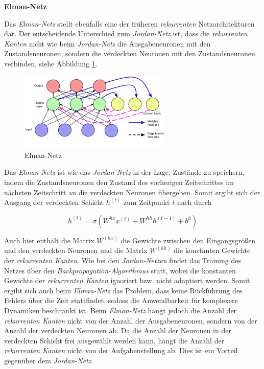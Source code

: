 \textbf{Elman-Netz}

Das \textit{Elman-Netz} stellt ebenfalls eine der früheren \textit{rekurrenten} Netzarchitekturen dar. Der entscheidende Unterschied zum \textit{Jordan-Netz} ist, dass die \textit{rekurrenten Kanten} nicht wie beim \textit{Jordan-Netz} die Ausgabeneuronen mit den Zustandsneuronen, sondern die verdeckten Neuronen mit den Zustandsneuronen verbinden, siehe Abbildung \ref{fig:elman}.

\begin{figure} [h]
	\centering
	\includegraphics[width=0.65\textwidth]{images/elman}
	\caption{Elman-Netz \cite{Lipton.5292015}}
	\label{fig:elman}
\end{figure}

Das \textit{Elman-Netz} ist wie das \textit{Jordan-Netz} in der Lage, Zustände zu speichern, indem die Zustandsneuronen den Zustand des vorherigen Zeitschrittes im nächsten Zeitschritt an die verdeckten Neuronen übergeben. Somit ergibt sich der Ausgang der verdeckten Schicht $h^{(t)}$ zum Zeitpunkt $t$ nach \cite{Elman.1990} durch 

\begin{equation}
h^{(t)} = \sigma(W^{hx}x^{(t)} + W^{hh}h^{(t-1)} + b^{h})
\end{equation}

Auch hier enthält die Matrix $W^{(hx)}$ die Gewichte zwischen den Eingangsgrößen und den verdeckten Neuronen und die Matrix $W^{(hh)}$ die konstanten Gewichte der \textit{rekurrenten Kanten}.
Wie bei den \textit{Jordan-Netzen} findet das Training des Netzes über den \textit{Backpropagation-Algorithmus} statt, wobei die konstanten Gewichte der \textit{rekurrenten Kanten} ignoriert bzw. nicht adaptiert werden. 
Somit ergibt sich auch beim \textit{Elman-Netz} das Problem, dass keine Rückführung des Fehlers über die Zeit stattfindet, sodass die Anwendbarkeit für komplexere Dynamiken beschränkt ist. Beim \textit{Elman-Netz} hängt jedoch die Anzahl der \textit{rekurrenten Kanten} nicht von der Anzahl der Ausgabeneuronen, sondern von der Anzahl der verdeckten Neuronen ab. Da die Anzahl der Neuronen in der verdeckten Schicht frei ausgewählt werden kann, hängt die Anzahl der \textit{rekurrenten Kanten} nicht von der Aufgabenstellung ab. Dies ist ein Vorteil gegenüber dem \textit{Jordan-Netz}.

